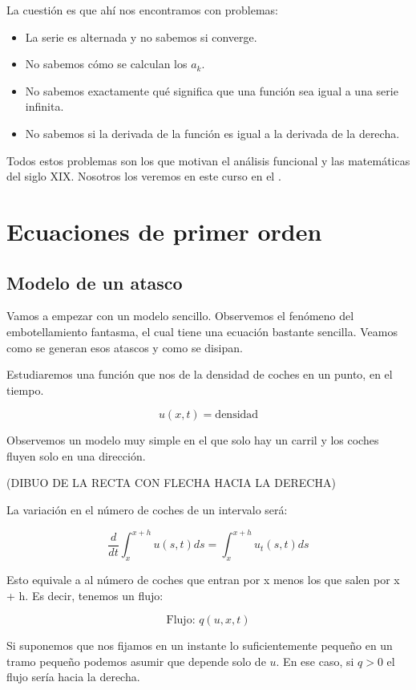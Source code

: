 \documentclass[palatino]{apuntes}
\begin{document}
La cuestión es que ahí nos encontramos con problemas:
\begin{itemize}
	\item La serie es alternada y no sabemos si converge.
	\item No sabemos cómo se calculan los $a_k$.
	\item No sabemos exactamente qué significa que una función sea igual a una serie infinita.
	\item No sabemos si la derivada de la función es igual a la derivada de la derecha.
\end{itemize}

Todos estos problemas son los que motivan el análisis funcional y las matemáticas del siglo XIX. Nosotros los veremos en este curso en el .

\chapter{Ecuaciones de primer orden}

\section{Modelo de un atasco}

Vamos a empezar con un modelo sencillo. Observemos el fenómeno del embotellamiento fantasma, el cual tiene una ecuación bastante sencilla. Veamos como se generan esos atascos y como se disipan.

Estudiaremos una función que nos de la densidad de coches en un punto, en el tiempo.

$$u(x,t) = \text{densidad}$$

Observemos un modelo muy simple en el que solo hay un carril y los coches fluyen solo en una dirección.

(DIBUO DE LA RECTA CON FLECHA HACIA LA DERECHA)

La variación en el número de coches de un intervalo será:

$$ \frac{d}{dt} \int^{x+h}_{x} u(s,t) ds = \int^{x+h}_{x} u_t(s,t) ds $$

Esto equivale a al número de coches que entran por x menos los que salen por x + h. Es decir, tenemos un flujo:

$$\text{Flujo: } q(u, x, t)$$

Si suponemos que nos fijamos en un instante lo suficientemente pequeño en un tramo pequeño podemos asumir que depende solo de $u$. En ese caso, si $q > 0$ el flujo sería hacia la derecha.
\end{document}
